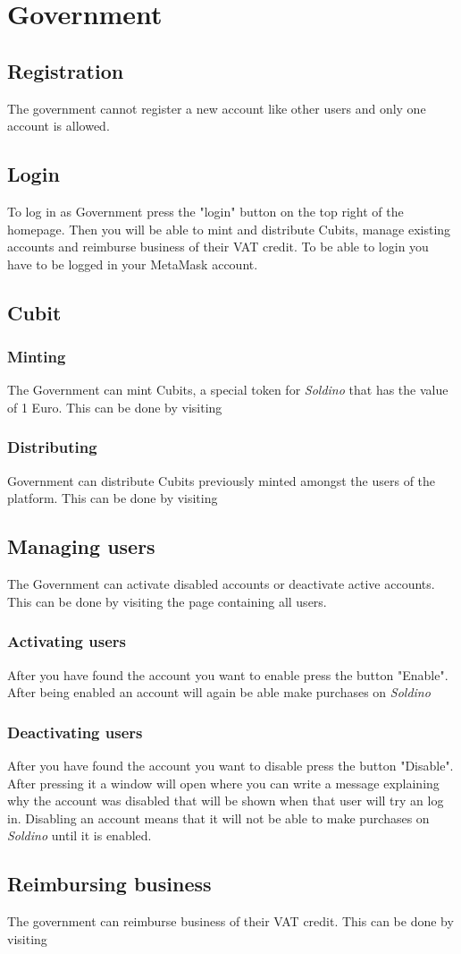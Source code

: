 \section{Government}
	\subsection{Registration}
	The government cannot register a new account like other users and only one 
	account is allowed. 
	\subsection{Login}
	To log in as Government press the "login" button on the top right of the 
	homepage. Then you will be able to mint and distribute Cubits, manage 
	existing accounts and reimburse business of their VAT credit. To be able to 
	login you have to be logged in your MetaMask account.
	\subsection{Cubit}
		\subsubsection{Minting}
		The Government can mint Cubits, a special token for \textit{Soldino} 
		that has the value of 1 Euro. This can be done by visiting 
		\subsubsection{Distributing}
		Government can distribute Cubits previously minted amongst the users of 
		the platform. This can be done by visiting 
	\subsection{Managing users}
	The Government can activate disabled accounts or deactivate active accounts.
	This can be done by visiting the page containing all users.
		\subsubsection{Activating users}
		After you have found the account you want to enable press the button 
		"Enable". After being enabled an account will again be able make purchases
		on \textit{Soldino}
		\subsubsection{Deactivating users}
		After you have found the account you want to disable press the button 
		"Disable". After pressing it a window will open where you can write a
		message explaining why the account was disabled that will be shown 
		when that user will try an log in. Disabling an account means that it 
		will not be able to make purchases on \textit{Soldino} until it is 
		enabled.
	\subsection{Reimbursing business}
	The government can reimburse business of their VAT credit. This can be done 
	by visiting %
